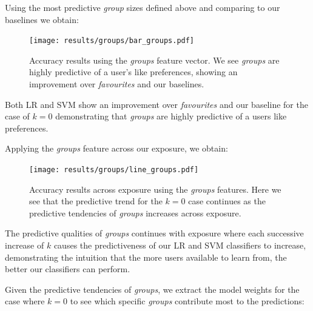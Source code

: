 Using the most predictive \emph{group} sizes defined above and comparing to our baselines we obtain:

\begin{figure}[h]
	\begin{center}
		\texttt{[image: results/groups/bar\_groups.pdf]}
		\caption{Accuracy results using the \emph{groups} feature vector. We see \emph{groups} are highly predictive of a user's like preferences, showing an improvement over \emph{favourites} and our baselines.}
	\end{center}
\end{figure}

Both LR and SVM show an improvement over \emph{favourites} and our baseline for the case of $k=0$ demonstrating that \emph{groups} are highly predictive of a users like preferences.

Applying the \emph{groups} feature across our exposure, we obtain:

\begin{figure}[h]
	\begin{center}
		\texttt{[image: results/groups/line\_groups.pdf]}
		\caption{Accuracy results across exposure using the \emph{groups} features. Here we see that the predictive trend for the $k=0$
				 case continues as the predictive tendencies of \emph{groups} increases across exposure.}
	\end{center}
\end{figure}



The predictive qualities of \emph{groups} continues with exposure where each successive increase of $k$ causes the predictiveness of our LR and SVM 
classifiers to increase, demonstrating the intuition that the more users available to learn from, the better our classifiers can perform.

Given the predictive tendencies of \emph{groups}, we extract the model weights for the case where $k=0$ to see which specific \emph{groups} 
contribute most to the predictions:

